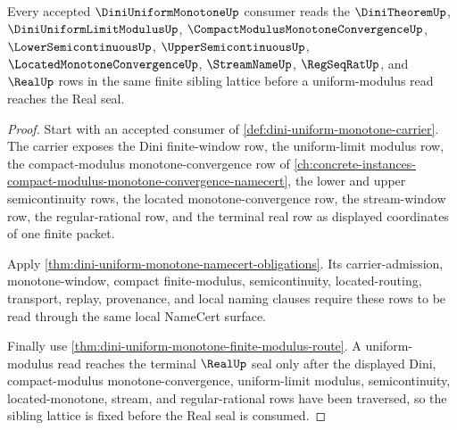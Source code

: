\begin{theorem}
\label{thm:dini-uniform-monotone-sibling-lattice-route}
Every accepted $\DiniUniformMonotoneUp$ consumer reads the $\DiniTheoremUp$, $\DiniUniformLimitModulusUp$, $\CompactModulusMonotoneConvergenceUp$, $\LowerSemicontinuousUp$, $\UpperSemicontinuousUp$, $\LocatedMonotoneConvergenceUp$, $\StreamNameUp$, $\RegSeqRatUp$, and $\RealUp$ rows in the same finite sibling lattice before a uniform-modulus read reaches the Real seal.
\end{theorem}
\begin{proof}
Start with an accepted consumer of \autoref{def:dini-uniform-monotone-carrier}. The carrier exposes the Dini finite-window row, the uniform-limit modulus row, the compact-modulus monotone-convergence row of \autoref{ch:concrete-instances-compact-modulus-monotone-convergence-namecert}, the lower and upper semicontinuity rows, the located monotone-convergence row, the stream-window row, the regular-rational row, and the terminal real row as displayed coordinates of one finite packet.

Apply \autoref{thm:dini-uniform-monotone-namecert-obligations}. Its carrier-admission, monotone-window, compact finite-modulus, semicontinuity, located-routing, transport, replay, provenance, and local naming clauses require these rows to be read through the same local NameCert surface.

Finally use \autoref{thm:dini-uniform-monotone-finite-modulus-route}. A uniform-modulus read reaches the terminal $\RealUp$ seal only after the displayed Dini, compact-modulus monotone-convergence, uniform-limit modulus, semicontinuity, located-monotone, stream, and regular-rational rows have been traversed, so the sibling lattice is fixed before the Real seal is consumed.
\end{proof}
